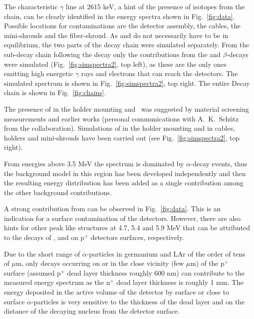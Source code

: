  The characteristic $\gamma$ line at 2615 keV, a hint of the presence of isotopes from the  chain, can be clearly identified in the energy spectra shown in Fig.~\ref{fig:data}. Possible locations for contaminations are the detector assembly, the cables, the mini-shrouds and the fiber-shroud. As  and  do not necessarily have to be in equilibrium, the two parts of the decay chain were simulated separately. From the sub-decay chain following the  decay only the contributions from the  and  $\beta$-decays were simulated (Fig.~\ref{fig:simspectra2}, top left), as these are the only ones emitting high energetic $\gamma$ rays and electrons that can reach the detectors. The simulated  spectrum is shown in Fig.~\ref{fig:simspectra2}, top right. The entire  Decay chain is shown in Fig.~\ref{fig:chains}.

 The presence of  in the holder mounting and  was suggested by material screening measurements and earlier works (personal communications with A.~K.~Schütz from the {\gerda} collaboration). Simulations of  in the holder mounting and  in cables, holders and mini-shrouds have been carried out (see Fig.~\ref{fig:simspectra2}, top right).

 From energies above 3.5 MeV the spectrum is dominated by $\alpha$-decay events, thus the background model in this region has been developed independently and then the resulting energy distribution has been added as a single contribution among the other background contributions.

A strong contribution from  can be observed in Fig.~\ref{fig:data}. This is an indication for a surface contamination of the detectors. However, there are also hints for other peak like structures at 4.7, 5.4 and 5.9 MeV that can be attributed to the decays of ,  and  on p$^+$ detectors surfaces, respectively.

Due to the short range of $\alpha$-particles in germanium and LAr of the order of tens of $\mu$m, only decays occurring on or in the close vicinity (few $\mu$m) of the p$^+$ surface (assumed p$^+$ dead layer thickness roughly 600 nm) can contribute to the measured energy spectrum as the n$^+$ dead layer thickness is roughly 1 mm. The energy deposited in the active volume of the detector by surface or close to surface $\alpha$-particles is very sensitive to the thickness of the dead layer and on the distance of the decaying nucleus from the detector surface.

